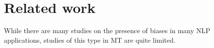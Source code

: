\documentclass[11pt,a4paper]{article}
\begin{document}
\section{Related work}
\label{sec:relwork}

While there are many studies on the presence of biases in many NLP applications, studies of this type in MT are quite limited.

\end{document}
